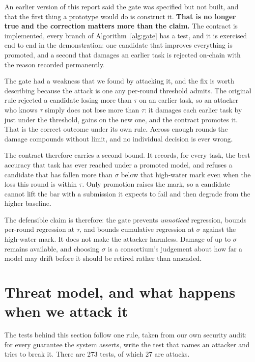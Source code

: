 \documentclass[11pt,a4paper]{article}
\begin{document}
An earlier version of this report said the gate was specified but not built, and
that the first thing a prototype would do is construct it. \textbf{That is no
longer true and the correction matters more than the claim.} The contract is
implemented, every branch of Algorithm~\ref{alg:gate} has a test, and it is
exercised end to end in the demonstration: one candidate that improves everything
is promoted, and a second that damages an earlier task is rejected on-chain with
the reason recorded permanently.

The gate had a weakness that we found by attacking it, and the fix is worth
describing because the attack is one any per-round threshold admits. The original
rule rejected a candidate losing more than $\tau$ on an earlier task, so an
attacker who knows $\tau$ simply does not lose more than $\tau$: it damages each
earlier task by just under the threshold, gains on the new one, and the contract
promotes it. That is the correct outcome under its own rule. Across enough
rounds the damage compounds without limit, and no individual decision is ever wrong.

The contract therefore carries a second bound. It records, for every task, the
best accuracy that task has ever reached under a promoted model, and refuses a
candidate that has fallen more than $\sigma$ below that high-water mark even
when the loss this round is within $\tau$. Only promotion raises the mark, so a
candidate cannot lift the bar with a submission it expects to fail and then
degrade from the higher baseline.

The defensible claim is therefore: the gate prevents \emph{unnoticed} regression,
bounds per-round regression at $\tau$, and bounds cumulative regression at
$\sigma$ against the high-water mark. It does not make the attacker harmless.
Damage of up to $\sigma$ remains available, and choosing $\sigma$ is a
consortium's judgement about how far a model may drift before it should be
retired rather than amended.

\section{Threat model, and what happens when we attack it}
\label{sec:security}

The tests behind this section follow one rule, taken from our own security audit:
for every guarantee the system asserts, write the test that names an attacker and
tries to break it. There are 273 tests, of which 27 are attacks.
\end{document}
